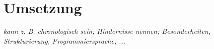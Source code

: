 \section{Umsetzung}

\textit{kann z. B. chronologisch sein; Hindernisse nennen; Besonderheiten, Strukturierung, Programmiersprache, ...}